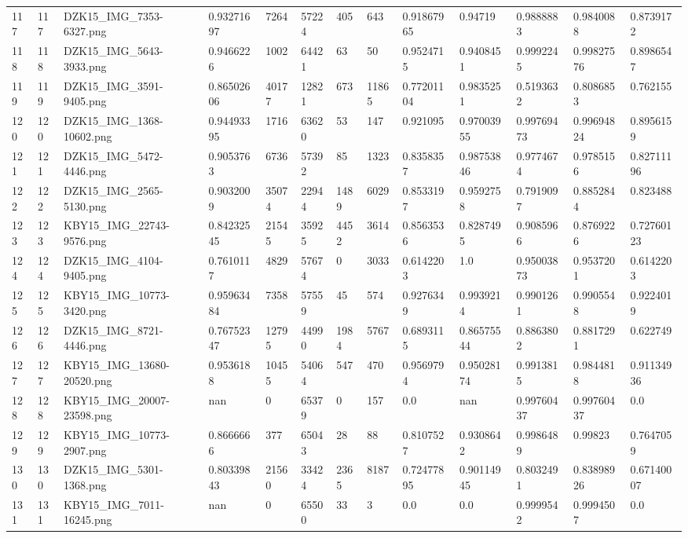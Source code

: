 \documentclass[11pt, a4paper, twoside]{report}
\begin{document}
\begin{longtable}[c]{@{}lllllllllllll@{}}
117 & 117 & DZK15\_IMG\_7353-6327.png & 0.93271697 & 7264 & 57224 & 405 & 643 & 0.91867965 & 0.94719 & 0.9888883 & 0.9840088 & 0.8739172 \\
118 & 118 & DZK15\_IMG\_5643-3933.png & 0.9466226 & 1002 & 64421 & 63 & 50 & 0.9524715 & 0.9408451 & 0.9992245 & 0.99827576 & 0.8986547 \\
119 & 119 & DZK15\_IMG\_3591-9405.png & 0.86502606 & 40177 & 12821 & 673 & 11865 & 0.77201104 & 0.9835251 & 0.5193632 & 0.8086853 & 0.762155 \\
120 & 120 & DZK15\_IMG\_1368-10602.png & 0.94493395 & 1716 & 63620 & 53 & 147 & 0.921095 & 0.97003955 & 0.99769473 & 0.99694824 & 0.8956159 \\
121 & 121 & DZK15\_IMG\_5472-4446.png & 0.9053763 & 6736 & 57392 & 85 & 1323 & 0.8358357 & 0.98753846 & 0.9774674 & 0.9785156 & 0.82711196 \\
122 & 122 & DZK15\_IMG\_2565-5130.png & 0.9032009 & 35074 & 22944 & 1489 & 6029 & 0.8533197 & 0.9592758 & 0.7919097 & 0.8852844 & 0.823488 \\
123 & 123 & KBY15\_IMG\_22743-9576.png & 0.84232545 & 21545 & 35925 & 4452 & 3614 & 0.8563536 & 0.8287495 & 0.9085966 & 0.8769226 & 0.72760123 \\
124 & 124 & DZK15\_IMG\_4104-9405.png & 0.7610117 & 4829 & 57674 & 0 & 3033 & 0.6142203 & 1.0 & 0.95003873 & 0.9537201 & 0.6142203 \\
125 & 125 & KBY15\_IMG\_10773-3420.png & 0.95963484 & 7358 & 57559 & 45 & 574 & 0.9276349 & 0.9939214 & 0.9901261 & 0.9905548 & 0.9224019 \\
126 & 126 & DZK15\_IMG\_8721-4446.png & 0.76752347 & 12795 & 44990 & 1984 & 5767 & 0.6893115 & 0.86575544 & 0.8863802 & 0.8817291 & 0.622749 \\
127 & 127 & KBY15\_IMG\_13680-20520.png & 0.9536188 & 10455 & 54064 & 547 & 470 & 0.9569794 & 0.95028174 & 0.9913815 & 0.9844818 & 0.91134936 \\
128 & 128 & KBY15\_IMG\_20007-23598.png & nan & 0 & 65379 & 0 & 157 & 0.0 & nan & 0.99760437 & 0.99760437 & 0.0 \\
129 & 129 & KBY15\_IMG\_10773-2907.png & 0.8666666 & 377 & 65043 & 28 & 88 & 0.8107527 & 0.9308642 & 0.9986489 & 0.99823 & 0.7647059 \\
130 & 130 & DZK15\_IMG\_5301-1368.png & 0.80339843 & 21560 & 33424 & 2365 & 8187 & 0.72477895 & 0.90114945 & 0.8032491 & 0.83898926 & 0.67140007 \\
131 & 131 & KBY15\_IMG\_7011-16245.png & nan & 0 & 65500 & 33 & 3 & 0.0 & 0.0 & 0.9999542 & 0.9994507 & 0.0 \\

\end{longtable}
\end{document}
